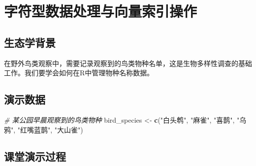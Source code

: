\documentclass[
]{book}
\newenvironment{Shaded}{\begin{snugshade}}{\end{snugshade}}
\newcommand{\CommentTok}[1]{\textcolor[rgb]{0.56,0.35,0.01}{\textit{#1}}}
\newcommand{\FunctionTok}[1]{\textcolor[rgb]{0.13,0.29,0.53}{\textbf{#1}}}
\newcommand{\NormalTok}[1]{#1}
\newcommand{\OtherTok}[1]{\textcolor[rgb]{0.56,0.35,0.01}{#1}}
\newcommand{\StringTok}[1]{\textcolor[rgb]{0.31,0.60,0.02}{#1}}
\begin{document}
\hypertarget{ux5b57ux7b26ux578bux6570ux636eux5904ux7406ux4e0eux5411ux91cfux7d22ux5f15ux64cdux4f5c}{%
\section{字符型数据处理与向量索引操作}\label{ux5b57ux7b26ux578bux6570ux636eux5904ux7406ux4e0eux5411ux91cfux7d22ux5f15ux64cdux4f5c}}

\hypertarget{ux751fux6001ux5b66ux80ccux666f-1}{%
\subsection{生态学背景}\label{ux751fux6001ux5b66ux80ccux666f-1}}

在野外鸟类观察中，需要记录观察到的鸟类物种名单，这是生物多样性调查的基础工作。我们要学会如何在R中管理物种名称数据。

\hypertarget{ux6f14ux793aux6570ux636e-1}{%
\subsection{演示数据}\label{ux6f14ux793aux6570ux636e-1}}

\begin{Shaded}
\begin{Highlighting}[]
\CommentTok{\# 某公园早晨观察到的鸟类物种}
\NormalTok{bird\_species }\OtherTok{\textless{}{-}} \FunctionTok{c}\NormalTok{(}\StringTok{"白头鹎"}\NormalTok{, }\StringTok{"麻雀"}\NormalTok{, }\StringTok{"喜鹊"}\NormalTok{, }\StringTok{"乌鸦"}\NormalTok{, }\StringTok{"红嘴蓝鹊"}\NormalTok{, }\StringTok{"大山雀"}\NormalTok{)}
\end{Highlighting}
\end{Shaded}

\hypertarget{ux8bfeux5802ux6f14ux793aux8fc7ux7a0b-1}{%
\subsection{课堂演示过程}\label{ux8bfeux5802ux6f14ux793aux8fc7ux7a0b-1}}
\end{document}
